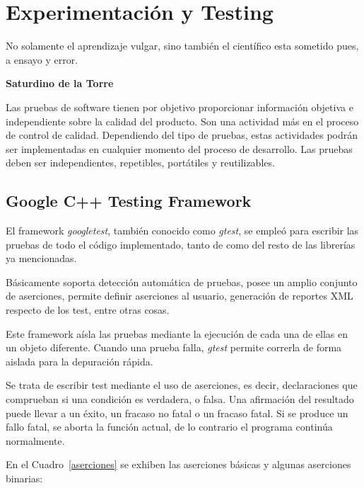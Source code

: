 \chapter{Experimentación y Testing}

\epigraph{No solamente el aprendizaje vulgar, sino
también el científico esta sometido pues, a ensayo
y error.}%
{\textbf{Saturdino de la Torre}}

Las pruebas de software tienen por objetivo proporcionar información objetiva e independiente sobre la calidad del producto. Son una actividad más en el proceso de control de calidad. Dependiendo del tipo de pruebas, estas actividades podrán ser implementadas en cualquier momento del proceso de desarrollo. Las pruebas deben ser independientes, repetibles, portátiles y reutilizables. 

\section{Google C++ Testing Framework}

\par El framework \emph{googletest}, también conocido como \emph{gtest}, se empleó para escribir las pruebas de todo el código implementado, tanto de \remo como del resto de las librerías ya mencionadas. 
\par Básicamente soporta detección automática de pruebas, posee un amplio conjunto de aserciones, permite definir aserciones al usuario, generación de reportes XML respecto de los test, entre otras cosas.

\par Este framework aísla las pruebas mediante la ejecución de cada una de ellas en un objeto diferente. Cuando una prueba falla, \emph{gtest} permite correrla de forma aislada para la depuración rápida. 

\par Se trata de escribir test mediante el uso de aserciones, es decir, declaraciones que comprueban si una condición es verdadera, o falsa. Una afirmación del resultado puede llevar a un éxito, un fracaso no fatal o un fracaso fatal. Si se produce un fallo fatal, se aborta la función actual, de lo contrario el programa continúa normalmente.

En el Cuadro~\ref{aserciones} se exhiben las aserciones básicas y algunas aserciones binarias:

